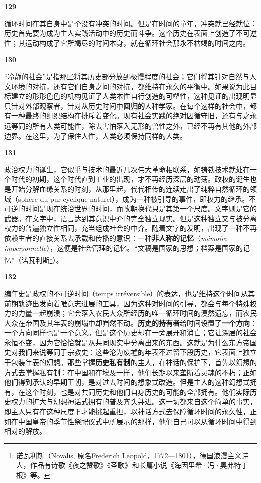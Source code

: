 \documentclass[fontset=fandol, a4paper, 12pt, openright]{ctexbook}
\makeatletter
\newcommand{\thesis}[1]{%
    \par\vspace{1.5em}%
    {\centering \textbf{\Large #1}\par}%
    \nobreak\vspace{0.5em}\nobreak
    \@afterindenttrue %
    \@afterheading    %
}
\makeatother
\begin{document}
\thesis{129}
循环时间在其自身中是个没有冲突的时间。但是在时间的童年，冲突就已经就位：历史首先要为成为主人实践活动中的历史而斗争。这个历史在表面上创造了不可逆性；其运动构成了它所竭尽的时间本身，就在循环社会那永不枯竭的时间之内。

\thesis{130}
“冷静的社会”是指那些将其历史部分放到极慢程度的社会；它们将其针对自然与人文环境的对抗，还有它们自身之间的对抗，都维持在永久的平衡中。如果说为此目标建立的形形色色的机构见证了人类本性自行创造的可塑性，这种见证的出现明显只针对外部观察者，针对从历史时间中\textbf{回归的}人种学家。在每个这样的社会中，都有一种最终的组织结构在排斥着变化。现有社会实践的绝对因循守旧，还有与之永远等同的所有人类可能性，除去害怕落入无形的兽性之外，已经不再有其他的外部边界。在这里，为了保住人性，人类必须保持同样的人类。

\thesis{131}
政治权力的诞生，它似乎与技术的最近几次伟大革命相联系，如铸铁技术就处在一个时代的初期，这个时代直到工业的出现，才不再经历深层的动荡。政权的诞生也是开始分解血缘关系的时刻，从那里起，代代相传的连续走出了纯粹自然循环的领域（sphère du pur cyclique naturel），成为一种被引导的事件，即权力的继承。不可逆的时间是现在统治世界的时间，而改朝换代只是其第一个尺度。文字则是它的武器。在文字中，语言达到其意识中介的完全独立现实。但是这种独立又与被分离权力的普遍独立性相同，充当组成社会的中介。随着文字的发明，出现了一种不再依赖生者的直接关系去承载和传播的意识：一种\textbf{非人称的记忆}（\textit{mémoire impersonnelle}），这便是社会管理的记忆。“文稿是国家的思想；档案是国家的记忆”（诺瓦利斯\footnote{诺瓦利斯（Novalis, 原名Frederich Leopold，1772—1801），德国浪漫主义诗人，作品有诗歌《夜之赞歌》《圣歌》和长篇小说《海因里希·冯·奥弗特丁根》等。}）。

\thesis{132}
编年史是政权的不可逆时间（temps irréversible）的表达，也是维持这个时间从其前期轨迹出发向着唯意志进展的工具，因为这种对时间的引导，都会与每个特殊权力的力量一起崩溃；它会落入农民大众所经历的唯一循环时间的漠然遗忘，而农民大众在帝国及其年表的崩塌中却岿然不动。\textbf{历史的持有者}给时间设置了\textbf{一个方向}：一个方向同样也是一个意义。但是这个历史却在一旁展开和消亡；它让深层的社会永恒不变，因为它恰恰就是从共同现实中分离出来的东西。这就是为什么东方帝国史对我们来说等同于宗教史：这些沦为废墟的年表不过留下段历史，它表面上独立于包装年表的幻想。那些掌握\textbf{历史私有制}的主人，在神话的保护下，首先以幻想的方式去掌握私有制：在中国和在埃及一样，他们长期以来垄断着灵魂的不朽；正如他们得到承认的早期王朝，是对过去时间的想象式改造。但是主人的这种幻想式拥有，在这个时刻，也是对共同历史和他们自身历史的可能的全部拥有。他们实际历史权力的扩大与幻想神话式拥有的普及齐头并进。这一切都来自这个简单的事实，即主人只有在这种尺度下才能挑起重担，以神话方式去保障循环时间的永久性，正如在中国皇帝的季节性祭祀仪式中所展示的那样，他们自己可以从循环时间中得到相对的解放。
\end{document}
